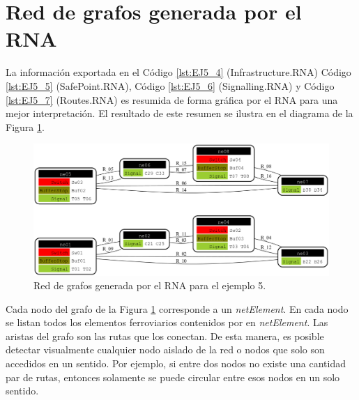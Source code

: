 \section{Red de grafos generada por el RNA}

	La información exportada en el Código \ref{lst:EJ5_4} (Infrastructure.RNA) Código \ref{lst:EJ5_5} (SafePoint.RNA), Código \ref{lst:EJ5_6} (Signalling.RNA) y Código \ref{lst:EJ5_7} (Routes.RNA) es resumida de forma gráfica por el RNA para una mejor interpretación. El resultado de este resumen se ilustra en el diagrama de la Figura \ref{fig:EJ5_8}.
	
	\begin{figure}[H]
		\centering
		\includegraphics[width=1\textwidth]{Figuras/Graph_5}
		\centering\caption{Red de grafos generada por el RNA para el ejemplo 5.}
		\label{fig:EJ5_8}
	\end{figure}
	
	Cada nodo del grafo de la Figura \ref{fig:EJ5_8} corresponde a un \textit{netElement}. En cada nodo se listan todos los elementos ferroviarios contenidos por en \textit{netElement}. Las aristas del grafo son las rutas que los conectan. De esta manera, es posible detectar visualmente cualquier nodo aislado de la red o nodos que solo son accedidos en un sentido. Por ejemplo, si entre dos nodos no existe una cantidad par de rutas, entonces solamente se puede circular entre esos nodos en un solo sentido.